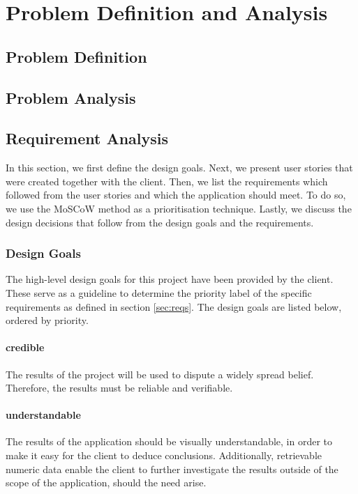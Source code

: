 \section{Problem Definition and Analysis}\label{sec:reqs-analysis}
\subsection{Problem Definition}

\subsection{Problem Analysis}
\subsection{Requirement Analysis}
In this section, we first define the design goals. Next, we present user stories that were created together with the client. Then, we list the requirements which followed from the user stories and which the application should meet. To do so, we use the MoSCoW method\cite{clegg1994case} as a prioritisation technique. Lastly, we discuss the design decisions that follow from the design goals and the requirements.




\subsubsection{Design Goals} \label{sec:design-goals}
The high-level design goals for this project have been provided by the client. These serve as a guideline to determine the priority label of the specific requirements as defined in section \ref{sec:reqs}. The design goals are listed below, ordered by priority.

\paragraph{credible} The results of the project will be used to dispute a widely spread belief. Therefore, the results must be reliable and verifiable.
\paragraph{understandable} The results of the application should be visually understandable, in order to make it easy for the client to deduce conclusions. Additionally, retrievable numeric data enable the client to further investigate the results outside of the scope of the application, should the need arise.

